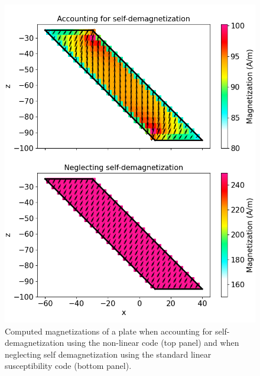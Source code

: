\begin{figure}[htb]
    \vspace{-0.1cm}
    \begin{center}
    \includegraphics[width=\columnwidth]{figures/Magnetization.png}
    \end{center}
    \vspace{-0.5cm}
\caption{
    Computed magnetizations of a plate when accounting for self-demagnetization using the non-linear code (top panel) and when neglecting self demagnetization using the standard linear susceptibility code (bottom panel).
}
\label{fig:magnetization}
\vspace{-0.1cm}
\end{figure}

